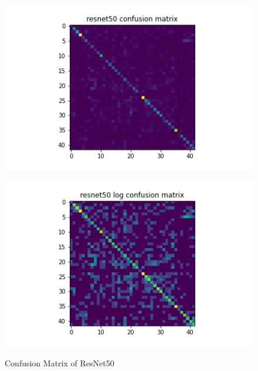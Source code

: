 \begin{figure}[H]
\begin{minipage}[b]{.5\linewidth}
    {\includegraphics[width=1.2\textwidth]{figs/conf_matrix/resnet50_conf.png}}
  \end{minipage}
  \hfill
  \begin{minipage}[b]{.5\linewidth}
    \centering

    {\includegraphics[width=1.2\textwidth]{figs/conf_matrix/resnet50_log_conf.png}}
  \end{minipage}

  \caption{Confusion Matrix of ResNet50}
  \label{fig:resnet50_conf}
  \vspace{0.2in}
\end{figure}

